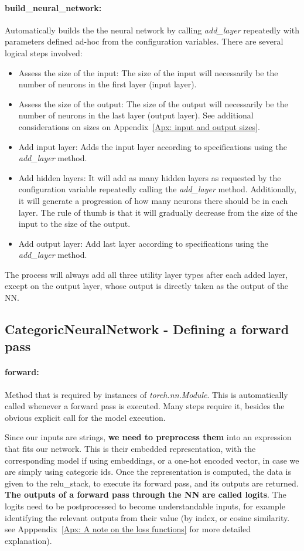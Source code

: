 \documentclass[a4paper, 11pt]{report}
\begin{document}
   \paragraph{build\_neural\_network:} Automatically builds the the neural network by calling \textit{add\_layer} repeatedly with parameters defined ad-hoc from the configuration variables. There are several logical steps involved:
   \begin{itemize}
       \item Assess the size of the input: The size of the input will necessarily be the number of neurons in the first layer (input layer).
       \item Assess the size of the output: The size of the output will necessarily be the number of neurons in the last layer (output layer). See additional considerations on sizes on Appendix~\ref{Apx: input and output sizes}.
       \item Add input layer: Adds the input layer according to specifications using the \textit{add\_layer} method.
       \item Add hidden layers: It will add as many hidden layers as requested by the configuration variable repeatedly calling the \textit{add\_layer} method. Additionally, it will generate a progression of how many neurons there should be in each layer. The rule of thumb is that it will gradually decrease from the size of the input to the size of the output.
       \item Add output layer: Add last layer according to specifications using the \textit{add\_layer} method.
   \end{itemize}
   The process will always add all three utility layer types after each added layer, except on the output layer, whose output is directly taken as the output of the NN.

    \subsection{CategoricNeuralNetwork - Defining a forward pass}

    \paragraph{forward:} Method that is required by instances of \textit{torch.nn.Module}. This is automatically called whenever a forward pass is executed. Many steps require it, besides the obvious explicit call for the model execution.

    Since our inputs are strings,\textbf{ we need to preprocess them} into an expression that fits our network. This is their embedded representation, with the corresponding model if using embeddings, or a one-hot encoded vector, in case we are simply using categoric ids. Once the representation is computed, the data is given to the relu\_stack, to execute its forward pass, and its outputs are returned. \textbf{The outputs of a forward pass through the NN are called logits}. The logits need to be postprocessed to become understandable inputs, for example identifying the relevant outputs from their value (by index, or cosine similarity. see Apppendix~\ref{Apx: A note on the loss functions} for more detailed explanation).
\end{document}
